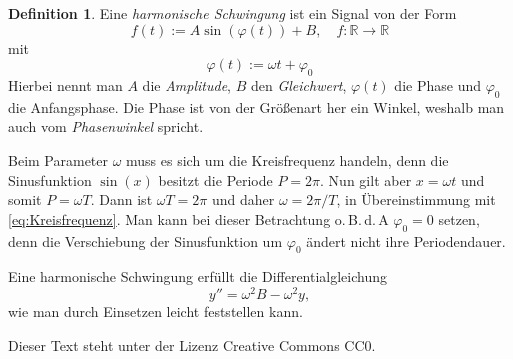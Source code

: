 \documentclass[a4paper,11pt,fleqn,twoside,dvipdfmx]{article}
\newcommand{\R}{\mathbb R}
\newcommand{\emdef}[1]{\emph{#1}}
\theoremstyle{definition}
\newtheorem{Definition}{Definition}
\theoremstyle{theorem}
\numberwithin{equation}{section}
\begin{document}
\begin{Definition}
Eine \emdef{harmonische Schwingung} ist ein Signal von der Form
\begin{equation}
f(t) := A\sin(\varphi(t))+B,\quad f\colon\R\to\R
\end{equation}
mit
\begin{equation}
\varphi(t) := \omega t+\varphi_0
\end{equation}
Hierbei nennt man $A$ die \emdef{Amplitude}, $B$ den \emdef{Gleichwert},
$\varphi(t)$ die Phase und $\varphi_0$ die Anfangsphase. Die
Phase ist von der Größenart her ein Winkel, weshalb man auch vom
\emdef{Phasenwinkel} spricht.
\end{Definition}
Beim Parameter $\omega$ muss es sich um die Kreisfrequenz handeln,
denn die Sinusfunktion $\sin(x)$ besitzt die Periode $P=2\pi$.
Nun gilt aber $x=\omega t$ und somit $P=\omega T$. Dann ist
$\omega T=2\pi$ und daher $\omega=2\pi/T$, in Übereinstimmung mit
\eqref{eq:Kreisfrequenz}. Man kann bei dieser Betrachtung
o.\,B.\,d.\,A $\varphi_0=0$ setzen, denn die Verschiebung
der Sinusfunktion um $\varphi_0$ ändert nicht ihre Periodendauer.

Eine harmonische Schwingung erfüllt die Differentialgleichung
\begin{equation}
y'' = \omega^2 B-\omega^2 y,
\end{equation}
wie man durch Einsetzen leicht feststellen kann.


\vfill\noindent
Dieser Text steht unter der Lizenz Creative Commons CC0.
\end{document}
